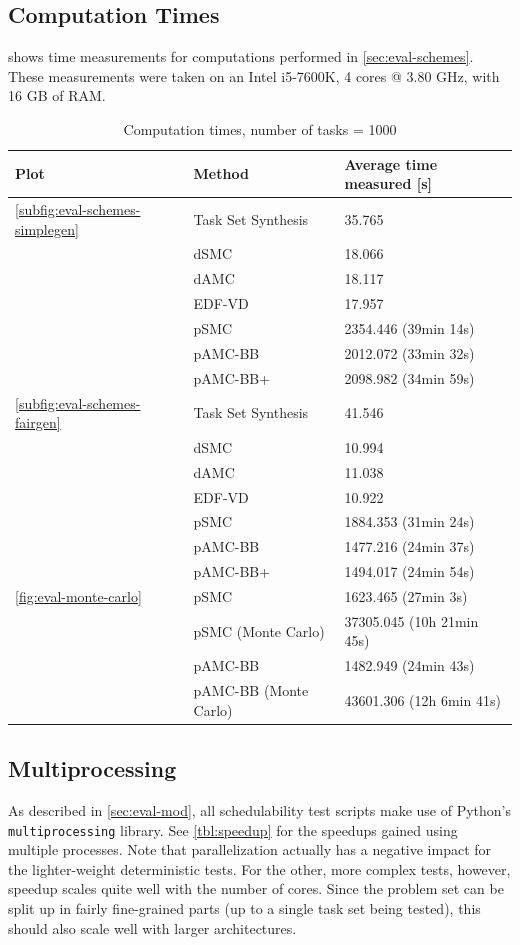 \documentclass[a4paper,oneside]{csthesis}
\begin{document}
\subsection{Computation Times}
 shows time measurements for computations performed in \cref{sec:eval-schemes}. These measurements were taken on an Intel i5-7600K, 4 cores @ 3.80 GHz, with 16 GB of RAM.
\begin{table}[ht]
    \centering
    \caption{Computation times, number of tasks = 1000}
    \label{tbl:computation-times}
    \begin{tabular}{@{}lll@{}}
        \toprule
        Plot & Method & Average time measured [s] \\ \midrule
        \cref{subfig:eval-schemes-simplegen} & Task Set Synthesis & 35.765 \\
        & dSMC & 18.066 \\
        & dAMC & 18.117 \\
        & EDF-VD & 17.957 \\
        & pSMC & 2354.446 (39min 14s) \\
        & pAMC-BB & 2012.072 (33min 32s) \\
        & pAMC-BB+ & 2098.982 (34min 59s) \\
        \midrule
        \cref{subfig:eval-schemes-fairgen} & Task Set Synthesis & 41.546 \\
        & dSMC & 10.994 \\
        & dAMC & 11.038 \\
        & EDF-VD & 10.922 \\
        & pSMC & 1884.353 (31min 24s) \\
        & pAMC-BB & 1477.216 (24min 37s) \\
        & pAMC-BB+ & 1494.017 (24min 54s) \\
        \midrule
        \cref{fig:eval-monte-carlo} & pSMC & 1623.465 (27min 3s) \\
        & pSMC (Monte Carlo) & 37305.045 (10h 21min 45s) \\
        & pAMC-BB & 1482.949 (24min 43s) \\
        & pAMC-BB (Monte Carlo) & 43601.306 (12h 6min 41s) \\
    \end{tabular}
\end{table}

\subsection{Multiprocessing}
As described in \cref{sec:eval-mod}, all schedulability test scripts make use of Python's \texttt{multiprocessing} library. See \cref{tbl:speedup} for the speedups gained using multiple processes. Note that parallelization actually has a negative impact for the lighter-weight deterministic tests. For the other, more complex tests, however, speedup scales quite well with the number of cores. Since the problem set can be split up in fairly fine-grained parts (up to a single task set being tested), this should also scale well with larger architectures.
\end{document}
